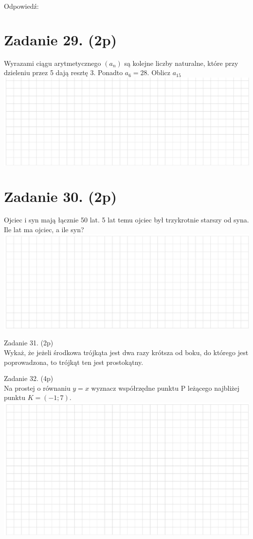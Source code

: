 \documentclass[10pt]{article}
\begin{document}
Odpowiedź:

\section*{Zadanie 29. (2p)}
Wyrazami ciągu arytmetycznego \(\left(a_{n}\right)\) są kolejne liczby naturalne, które przy dzieleniu przez 5 dają resztę 3. Ponadto \(a_{6}=28\). Oblicz \(a_{15}\)\\
\includegraphics[max width=\textwidth, center]{2024_11_21_cce9c7ad32a1dbcd58dag-10}

\section*{Zadanie 30. (2p)}
Ojciec i syn mają łącznie 50 lat. 5 lat temu ojciec był trzykrotnie starszy od syna. Ile lat ma ojciec, a ile syn?\\
\includegraphics[max width=\textwidth, center]{2024_11_21_cce9c7ad32a1dbcd58dag-10(1)}

Zadanie 31. (2p)\\
Wykaż, że jeżeli środkowa trójkąta jest dwa razy krótsza od boku, do którego jest poprowadzona, to trójkąt ten jest prostokątny.

Zadanie 32. (4p)\\
Na prostej o równaniu \(y=x\) wyznacz współrzędne punktu P leżącego najbliżej punktu \(K=(-1 ; 7)\).\\
\includegraphics[max width=\textwidth, center]{2024_11_21_cce9c7ad32a1dbcd58dag-11}
\end{document}
